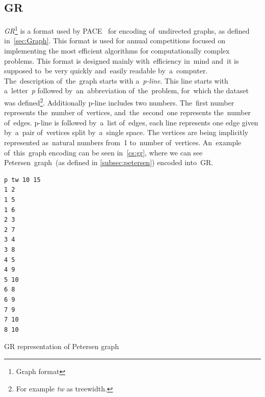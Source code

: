 \subsection{GR}
\textit{GR}\footnote{Graph format} is a format used by PACE~\cite{PACE} for encoding of~undirected graphs, as defined in~\autoref{sec:Graph}. This format is used for annual competitions focused on implementing the most efficient algorithms for computationally complex problems. 
This format is designed mainly with~efficiency in~mind and~it is supposed to~be very quickly and~easily readable by~a~computer.\\
The~description of~the~graph starts with a~\textit{p-line}. This line starts with a~letter~\textit{p} followed by~an~abbreviation of~the~problem, for~which the dataset was defined\footnote{For example \textit{tw} as treewidth.}. Additionally p-line includes two numbers. The~first number represents the~number of~vertices, and~the~second~one represents the~number of~edges. p-line is followed by~a~list of~edges, each line represents one edge given by~a~pair of~vertices split by~a~single space. The vertices are being implicitly represented as~natural numbers from~1 to~number of~vertices. An~example of~this~graph encoding can be seen in~\autoref{cs:gr}, where we can see Petersen~graph~(as defined in \autoref{subsec:petersen}) encoded into~GR.
\begin{listing}
\begin{verbatim}
p tw 10 15 
1 2
1 5
1 6
2 3
2 7
3 4
3 8
4 5
4 9
5 10
6 8
6 9
7 9
7 10
8 10
\end{verbatim}
\caption{GR representation of Petersen graph}
\label{cs:gr}
\end{listing}

